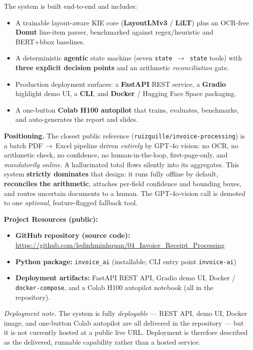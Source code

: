 \documentclass[12pt,a4paper]{article}
\begin{document}
The system is built end-to-end and includes:
\begin{itemize}
  \item A trainable layout-aware KIE core (\textbf{LayoutLMv3} / \textbf{LiLT}) plus an OCR-free \textbf{Donut} line-item parser, benchmarked against regex/heuristic and BERT+bbox baselines.
  \item A deterministic \textbf{agentic} state machine (seven \texttt{state\,$\to$\,state} tools) with \textbf{three explicit decision points} and an arithmetic \emph{reconciliation} gate.
  \item Production deployment surfaces: a \textbf{FastAPI} REST service, a \textbf{Gradio} highlight demo UI, a \textbf{CLI}, and \textbf{Docker} / Hugging Face Space packaging.
  \item A one-button \textbf{Colab H100 autopilot} that trains, evaluates, benchmarks, and auto-generates the report and slides.
\end{itemize}

\textbf{Positioning.} The closest public reference (\texttt{ruizguille/invoice-processing})
is a batch PDF\,$\to$\,Excel pipeline driven \emph{entirely} by GPT-4o vision: no OCR,
no arithmetic check, no confidence, no human-in-the-loop, first-page-only, and
\emph{mandatorily online}. A hallucinated total flows silently into its aggregates.
This system \textbf{strictly dominates} that design: it runs fully offline by default,
\textbf{reconciles the arithmetic}, attaches per-field confidence and bounding boxes,
and routes uncertain documents to a human. The GPT-4o-vision call is demoted to one
\emph{optional}, feature-flagged fallback tool.

\textbf{Project Resources (public):}
\begin{itemize}\setlength\itemsep{0.15em}
  \item \textbf{GitHub repository (source code):} \url{https://github.com/ledinhminhquan/04_Invoice_Receipt_Processing}
  \item \textbf{Python package:} \texttt{invoice\_ai} (installable; CLI entry point \texttt{invoice-ai})
  \item \textbf{Deployment artifacts:} FastAPI REST API, Gradio demo UI, Docker / \texttt{docker-compose}, and a Colab H100 autopilot notebook (all in the repository).
\end{itemize}

\noindent\textit{Deployment note.} The system is fully \emph{deployable} --- REST API,
demo UI, Docker image, and one-button Colab autopilot are all delivered in the
repository --- but it is not currently hosted at a public live URL. Deployment is
therefore described as the delivered, runnable capability rather than a hosted service.
\end{document}
